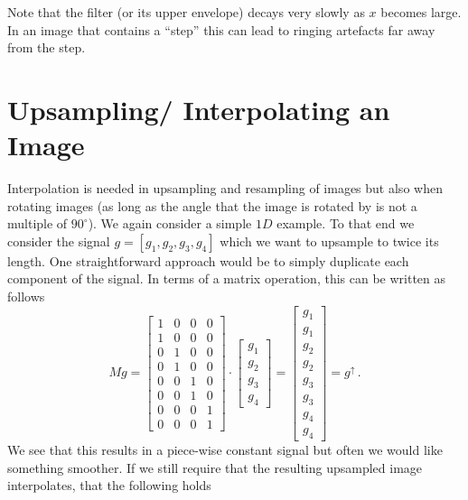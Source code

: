 Note that the filter (or its upper envelope) decays very slowly as $x$ becomes
large. In an image that contains a ``step'' this can lead to ringing artefacts
far away from the step.

\section{Upsampling/ Interpolating an Image}
Interpolation is needed in upsampling and resampling of images but also when
rotating images (as long as the angle that the image is rotated by is not a
multiple of $90^\circ$). We again consider a simple $1D$ example. To that end we
consider the signal $g = [g_1, g_2, g_3, g_4]$ which we want to upsample to
twice its length. One straightforward approach would be to simply duplicate each
component of the signal.
In terms of a matrix operation, this can be written as follows
\begin{equation}
  \label{eq:box_filter:matrix}
  Mg=
  \begin{bmatrix}
    1 & 0 & 0 & 0 \\
    1 & 0 & 0 & 0 \\
    0 & 1 & 0 & 0 \\
    0 & 1 & 0 & 0 \\
    0 & 0 & 1 & 0 \\
    0 & 0 & 1 & 0 \\
    0 & 0 & 0 & 1 \\
    0 & 0 & 0 & 1
  \end{bmatrix}
  \cdot
  \begin{bmatrix}
    g_1 \\ g_2 \\ g_3 \\ g_4
  \end{bmatrix}
  =
  \begin{bmatrix}
    g_1 \\ g_1 \\
    g_2 \\ g_2 \\
    g_3 \\ g_3 \\
    g_4 \\ g_4
  \end{bmatrix}
  = g^\uparrow\,.
\end{equation}
We see that this results in a piece-wise constant signal but often we would like
something smoother. If we still require that the resulting upsampled image
interpolates, \ie that the following holds
